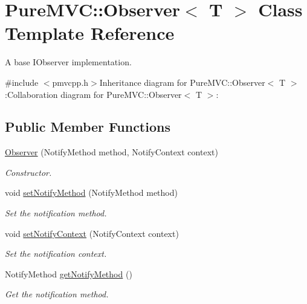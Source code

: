 \hypertarget{class_pure_m_v_c_1_1_observer}{
\section{PureMVC::Observer$<$ T $>$ Class Template Reference}
\label{class_pure_m_v_c_1_1_observer}
}


A base {\ttfamily IObserver} implementation.  


{\ttfamily \#include $<$pmvcpp.h$>$}Inheritance diagram for PureMVC::Observer$<$ T $>$:Collaboration diagram for PureMVC::Observer$<$ T $>$:\subsection*{Public Member Functions}
\begin{DoxyCompactItemize}
\item 
\hyperlink{class_pure_m_v_c_1_1_observer_a8cbe9fac70f2e56a976afaad3fd64d4d}{Observer} (NotifyMethod method, NotifyContext context)
\begin{DoxyCompactList}\small\item\em Constructor. \item\end{DoxyCompactList}\item 
void \hyperlink{class_pure_m_v_c_1_1_observer_a288e402c45c332dd8765bff6bcdd087e}{setNotifyMethod} (NotifyMethod method)
\begin{DoxyCompactList}\small\item\em Set the notification method. \item\end{DoxyCompactList}\item 
void \hyperlink{class_pure_m_v_c_1_1_observer_a832268c15c727dd0ba0b31fc5bf91308}{setNotifyContext} (NotifyContext context)
\begin{DoxyCompactList}\small\item\em Set the notification context. \item\end{DoxyCompactList}\item 
NotifyMethod \hyperlink{class_pure_m_v_c_1_1_observer_a758265dc2431974f8deb4019b330bc64}{getNotifyMethod} ()
\begin{DoxyCompactList}\small\item\em Get the notification method. \item\end{DoxyCompactList}\item 

\end{DoxyCompactItemize}
